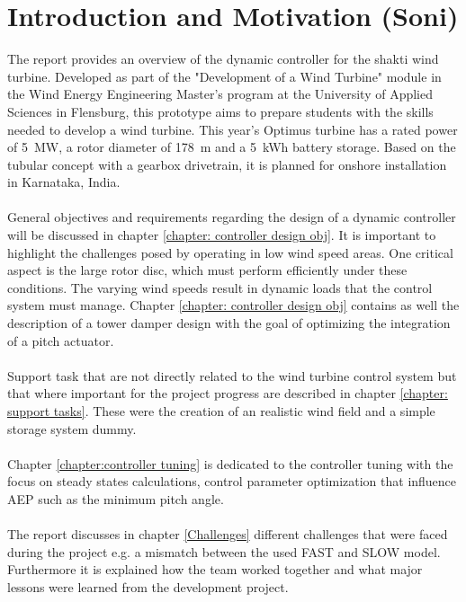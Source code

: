 \chapter{Introduction and Motivation (Soni)}

The report provides an overview of the dynamic controller for the \gls{shakti} wind turbine. Developed as part of the "Development of a Wind Turbine" module in the Wind Energy Engineering Master’s program at the University of Applied Sciences in Flensburg, this prototype aims to prepare students with the skills needed to develop a wind turbine. This year’s Optimus turbine has a rated power of \SI{5}{MW}, a rotor diameter of \SI{178}{m} and a \SI{5}{kWh} battery storage. Based on the tubular concept with a gearbox drivetrain, it is planned for onshore installation in Karnataka, India.
\\
\\
General objectives and requirements regarding the design of a dynamic controller will be discussed in chapter \ref{chapter: controller design obj}. 
It is important to highlight the challenges posed by operating in low wind speed areas.
One critical aspect is the large rotor disc, which must perform efficiently under these conditions.
The varying wind speeds result in dynamic loads that the control system must manage.
Chapter \ref{chapter: controller design obj} contains as well the description of a tower damper design with the goal of optimizing the integration of a pitch actuator.
\\
\\
Support task that are not directly related to the wind turbine control system but that where important for the project progress are described in chapter \ref{chapter: support tasks}. 
These were the creation of an realistic wind field and a simple storage system dummy.
\\
\\
Chapter \ref{chapter:controller tuning} is dedicated to the controller tuning with the focus on steady states calculations, control parameter optimization that influence \gls{AEP} such as the minimum pitch angle.
\\
\\
The report discusses in chapter \ref{Challenges} different challenges that were faced during the project e.g. a mismatch between the used \gls{FAST} and \gls{SLOW} model. Furthermore it is explained how the team worked together and what major lessons were learned from the development project.
